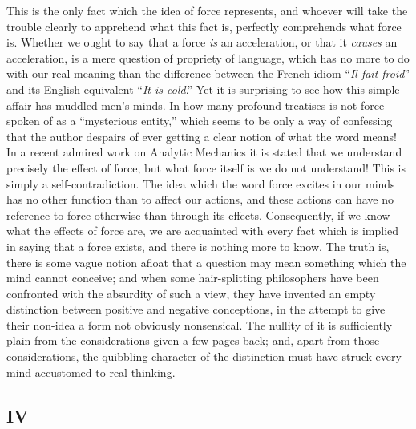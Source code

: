 This is the only fact which the idea of force represents, and whoever will take the trouble clearly to apprehend what this fact is, perfectly comprehends what force is. Whether we ought to say that a force \emph{is} an acceleration, or that it \emph{causes} an acceleration, is a mere question of propriety of language, which has no more to do with our real meaning than the difference between the French idiom ``\emph{Il fait froid}'' and its English equivalent ``\emph{It is cold}.'' Yet it is surprising to see how this simple affair has muddled men's minds. In how many profound treatises is not force spoken of as a ``mysterious entity,'' which seems to be only a way of confessing that the author despairs of ever getting a clear notion of what the word means! In a recent admired work on Analytic Mechanics it is stated that we understand precisely the effect of force, but what force itself is we do not understand! This is simply a self-contradiction. The idea which the word force excites in our minds has no other function than to affect our actions, and these actions can have no reference to force otherwise than through its effects. Consequently, if we know what the effects of force are, we are acquainted with every fact which is implied in saying that a force exists, and there is nothing more to know. The truth is, there is some vague notion afloat that a question may  mean something which the mind cannot conceive; and when some hair-splitting philosophers have been confronted with the absurdity of such a view, they have invented an empty distinction between positive and negative conceptions, in the attempt to give their non-idea a form not obviously nonsensical. The nullity of it is sufficiently plain from the considerations given a few pages back; and, apart from those considerations, the quibbling character of the distinction must have struck every mind accustomed to real thinking.

\subsection*{IV}



